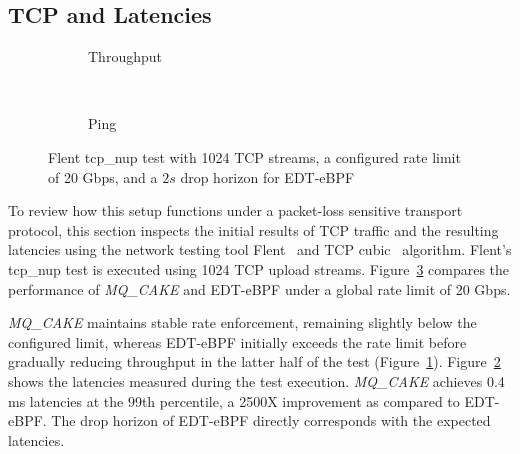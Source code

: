 \subsection{TCP and Latencies}
\begin{figure}
    \centering
    \hspace{-0.25cm}
    \begin{subfigure}{\linewidth}
        \centering
        
        \caption{Throughput}\label{fig:flent_tp_2s}
    \end{subfigure}
    \\
    \begin{subfigure}{\linewidth}
        \centering
        
        \caption{Ping}\label{fig:flent_ping_2s}
    \end{subfigure}
    \caption{Flent tcp\_nup test with 1024 TCP streams, a configured rate limit of 20 Gbps, and a $2s$ drop horizon for EDT-eBPF}\label{fig:flent_2s}
\end{figure}

To review how this setup functions under a packet-loss sensitive transport protocol, this section inspects the initial results of TCP traffic and the resulting latencies using the network testing tool Flent~\cite{flent} and TCP cubic~\cite{tcp-cubic} algorithm.
%
Flent's tcp\_nup test is executed using 1024 TCP upload streams.
%
Figure~\ref{fig:flent_2s} compares the performance of \textit{MQ\_CAKE} and EDT-eBPF under a global rate limit of 20 Gbps.

\textit{MQ\_CAKE} maintains stable rate enforcement, remaining slightly below the configured limit, whereas EDT-eBPF initially exceeds the rate limit before gradually reducing throughput in the latter half of the test (Figure~\ref{fig:flent_tp_2s}).
%
Figure~\ref{fig:flent_ping_2s} shows the latencies measured during the test execution. \textit{MQ\_CAKE} achieves 0.4 ms latencies at the 99th percentile, a 2500X improvement as compared to EDT-eBPF.
%
The drop horizon of EDT-eBPF directly corresponds with the expected latencies.
%

